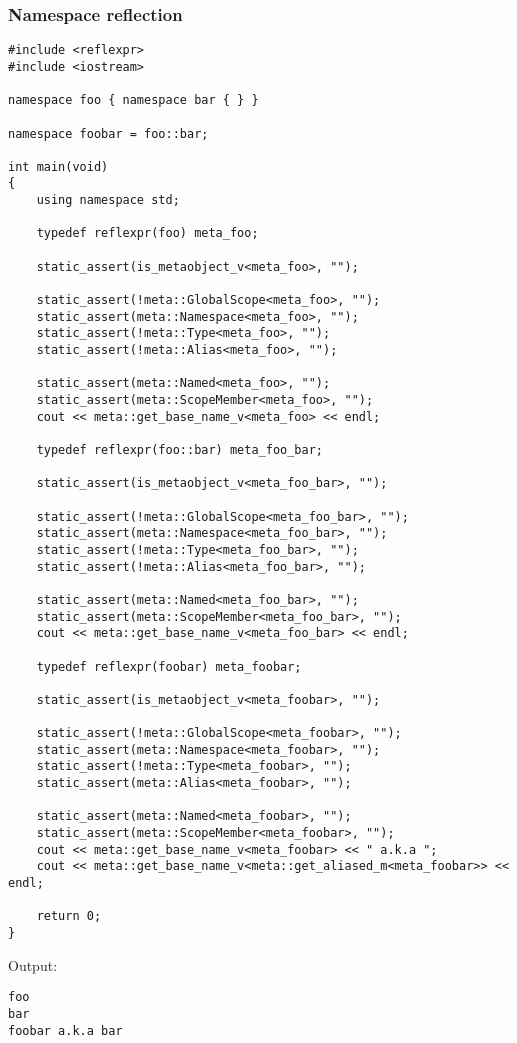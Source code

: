 \subsubsection{Namespace reflection}

\begin{verbatim}
#include <reflexpr>
#include <iostream>

namespace foo { namespace bar { } }

namespace foobar = foo::bar;

int main(void)
{
	using namespace std;

	typedef reflexpr(foo) meta_foo;

	static_assert(is_metaobject_v<meta_foo>, "");

	static_assert(!meta::GlobalScope<meta_foo>, "");
	static_assert(meta::Namespace<meta_foo>, "");
	static_assert(!meta::Type<meta_foo>, "");
	static_assert(!meta::Alias<meta_foo>, "");

	static_assert(meta::Named<meta_foo>, "");
	static_assert(meta::ScopeMember<meta_foo>, "");
	cout << meta::get_base_name_v<meta_foo> << endl;

	typedef reflexpr(foo::bar) meta_foo_bar;

	static_assert(is_metaobject_v<meta_foo_bar>, "");

	static_assert(!meta::GlobalScope<meta_foo_bar>, "");
	static_assert(meta::Namespace<meta_foo_bar>, "");
	static_assert(!meta::Type<meta_foo_bar>, "");
	static_assert(!meta::Alias<meta_foo_bar>, "");

	static_assert(meta::Named<meta_foo_bar>, "");
	static_assert(meta::ScopeMember<meta_foo_bar>, "");
	cout << meta::get_base_name_v<meta_foo_bar> << endl;

	typedef reflexpr(foobar) meta_foobar;

	static_assert(is_metaobject_v<meta_foobar>, "");

	static_assert(!meta::GlobalScope<meta_foobar>, "");
	static_assert(meta::Namespace<meta_foobar>, "");
	static_assert(!meta::Type<meta_foobar>, "");
	static_assert(meta::Alias<meta_foobar>, "");

	static_assert(meta::Named<meta_foobar>, "");
	static_assert(meta::ScopeMember<meta_foobar>, "");
	cout << meta::get_base_name_v<meta_foobar> << " a.k.a ";
	cout << meta::get_base_name_v<meta::get_aliased_m<meta_foobar>> << endl;

	return 0;
}
\end{verbatim}

Output:

\begin{verbatim}
foo
bar
foobar a.k.a bar
\end{verbatim}

